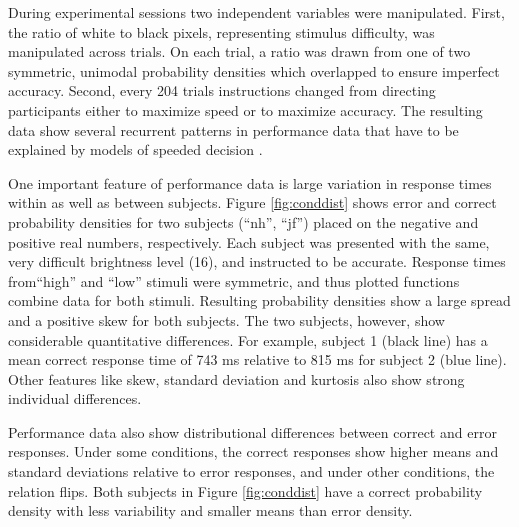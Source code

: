 \documentclass[12pt]{article}
\begin{document}
During experimental sessions two independent variables were manipulated. First, the
ratio of white to black pixels, representing stimulus difficulty, was manipulated across
trials. On each trial, a ratio was drawn from one of two symmetric, unimodal probability densities which overlapped to ensure imperfect accuracy. Second,
every 204 trials instructions changed from directing participants either to
maximize speed or to maximize accuracy. The resulting data show several recurrent patterns in performance data that have to be explained by models of speeded decision \citep{RatMck2008}.

One important feature of performance data is large variation in response times within as well as between subjects. Figure \ref{fig:conddist} shows error and correct probability densities for two subjects (``nh'', ``jf'') placed on the negative and positive real numbers, respectively. Each subject was presented with the same, very difficult brightness level (16), and instructed to be accurate. Response times from``high'' and ``low'' stimuli were symmetric, and thus plotted functions combine data for both stimuli. Resulting probability densities show a large spread and a positive skew for both subjects. The two subjects, however, show considerable quantitative differences. For example, subject 1 (black line) has a mean correct response time of 743 ms relative to 815 ms for subject 2 (blue line). Other features like skew, standard deviation and kurtosis also show strong individual differences.

Performance data also show distributional differences between correct and error responses. Under some conditions, the correct responses show higher means and standard deviations relative to error responses, and under other conditions, the relation flips. Both subjects in Figure \ref{fig:conddist} have a correct probability density with less variability and smaller means than error density.
\end{document}
